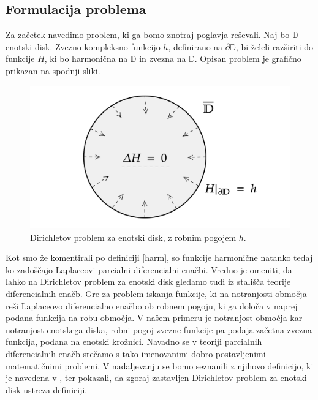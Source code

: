 \documentclass[mat1, tisk]{fmfdelo}
\begin{document}
\subsection{Formulacija problema}
    Za začetek navedimo problem, ki ga bomo znotraj poglavja reševali.
    Naj bo $\mathbb{D}$ enotski disk. Zvezno kompleksno funkcijo $h$, definirano na $\partial \mathbb{D}$, bi želeli razširiti do funkcije $H$, ki bo harmonična na $\mathbb{D}$ in zvezna na $\overline{\mathbb{D}}$.
    Opisan problem je grafično prikazan na spodnji sliki. 
    \begin{figure}[H]
        \begin{center}
            \includegraphics[width = \textwidth]{dirichlet_form.png}
            \caption{Dirichletov problem za enotski disk, z robnim pogojem $h$.}
        \end{center}    
    \end{figure}

    Kot smo že komentirali po definiciji \ref{harm}, so funkcije harmonične natanko tedaj ko zadoščajo Laplaceovi parcialni diferencialni enačbi.   
    Vredno je omeniti, da lahko na Dirichletov problem za enotski disk gledamo tudi iz stališča teorije diferencialnih enačb. Gre za problem iskanja funkcije, ki na notranjosti območja reši Laplaceovo diferencialno enačbo ob robnem pogoju, ki ga določa v naprej podana funkcija na robu območja.     
    V našem primeru je notranjost območja kar notranjost enotskega diska, robni pogoj zvezne funkcije pa podaja začetna zvezna funkcija, podana na enotski krožnici.
    Navadno se v teoriji parcialnih diferencialnih enačb srečamo s tako imenovanimi dobro postavljenimi matematičnimi problemi.     
    V nadaljevanju se bomo seznanili z njihovo definicijo, ki je navedena v \cite[stran 7]{evans}, ter pokazali, da zgoraj zastavljen Dirichletov problem za enotski disk ustreza definiciji. 
\end{document}
